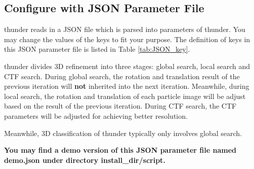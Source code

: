 \documentclass{article}
\begin{document}
        \subsection{Configure with JSON Parameter File}\label{sec:JSON}
        
            \textsf{thunder} reads in a JSON file which is parsed into parameters of \textsf{thunder}. You may change the values of the keys to fit your purpose. The definition of keys in this JSON parameter file is listed in Table \ref{tab:JSON_key}.
            
            \textsf{thunder} divides 3D refinement into three stages: global search, local search and CTF search. During global search, the rotation and translation result of the previous iteration will \textbf{not} inherited into the next iteration. Meanwhile, during local search, the rotation and translation of each particle image will be adjust based on the result of the previous iteration. During CTF search, the CTF parameters will be adjusted for achieving better resolution.
            
            Meanwhile, 3D classification of \textsf{thunder} typically only involves global search.
                        
            \textbf{You may find a demo version of this JSON parameter file named \textsf{demo.json} under directory \textsf{install\_dir/script}.}
             
\end{document}
